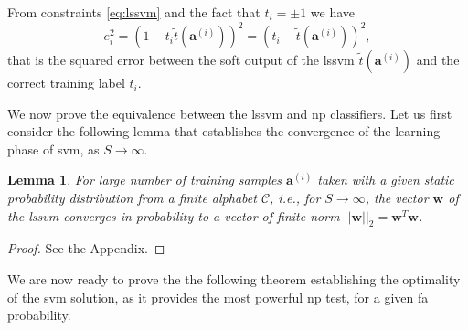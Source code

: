 \documentclass[draftcls,onecolumn,12pt]{IEEEtran}
\newtheorem{lemma}{Lemma}
\begin{document}
From  constraints  \eqref{eq:lssvm} and the fact that $t_i = \pm 1$ we have
\begin{equation}
\label{eq:els}
e_i^2 = (1 - t_i\tilde{t}(\bm{a}^{(i)}) )^2 = (t_i - \tilde{t}(\bm{a}^{(i)}))^2,
\end{equation}
that is the squared error between the soft output of the \ac{lssvm} $\tilde{t}(\bm{a}^{(i)})$ and the correct training label $t_i$.

We now prove the equivalence between the \ac{lssvm} and \ac{np} classifiers. Let us first consider the following lemma that establishes the convergence of the learning phase of \ac{svm}, as $S\rightarrow \infty$.

\begin{lemma}
	\label{lem:lem1}
	For large number of training samples $\bm{a}^{(i)}$ taken with a given static probability distribution from a finite alphabet $\mathcal C$, i.e., for $S \rightarrow \infty$, the vector $\bm{w}$ of the \ac{lssvm} converges in probability to a vector of finite norm $||\bm{w}||_2 = \bm{w}^T\bm{w}$.
\end{lemma}

\begin{proof}
See the Appendix.
\end{proof}
 
We are now ready to prove the the following theorem establishing the optimality of the \ac{svm} solution, as it provides the most powerful \ac{np} test, for a given \ac{fa} probability.
\end{document}
